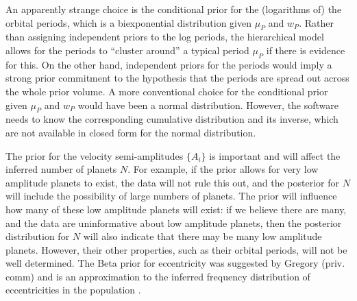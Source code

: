 \documentclass[useAMS,usenatbib]{mn2e}
\begin{document}
An apparently strange choice is the conditional prior for the (logarithms of)
the orbital
periods, which is a biexponential distribution given $\mu_P$ and $w_P$.
Rather than assigning independent priors to the log periods, the hierarchical
model allows for the periods to ``cluster around'' a typical period $\mu_P$ if
there is evidence for this. On the other hand, independent priors for the
periods would imply a strong prior commitment to the hypothesis that the
periods are spread out across the whole prior volume.
A more conventional choice for the conditional prior given $\mu_P$ and $w_P$
would have been a normal distribution. However, the \citet{rjobject} software
needs to know the corresponding cumulative distribution and its inverse, which
are not available in closed form for the normal distribution.

The prior for the velocity semi-amplitudes $\{A_i\}$ is important and will affect the
inferred number of planets $N$. For example, if the prior allows for very
low amplitude planets to exist, the data will not rule this out, and the posterior
for $N$ will include the possibility of large numbers of planets. The prior
will influence how many of these low amplitude planets will exist: if we
believe there are many, and the data are uninformative about low amplitude
planets, then the posterior distribution for $N$ will also indicate that there
may be many low amplitude planets. However, their other properties, such as
their orbital periods, will not be well determined. The Beta prior for
eccentricity was suggested by Gregory (priv. comm) and is an approximation
to the inferred frequency distribution of eccentricities in the population
\citep{kipping}.
\end{document}
